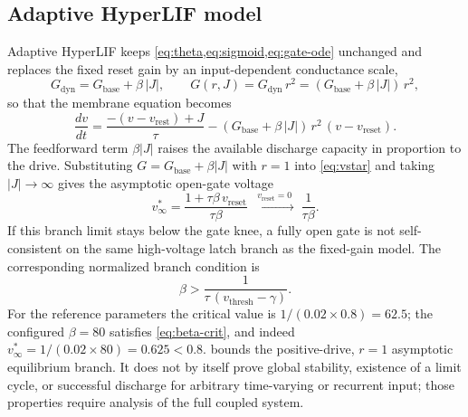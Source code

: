 \documentclass[11pt]{article}
\newcommand{\vth}{v_{\mathrm{thresh}}}
\newcommand{\vr}{v_{\mathrm{rest}}}
\newcommand{\vre}{v_{\mathrm{reset}}}
\newcommand{\Gbase}{G_{\mathrm{base}}}
\newcommand{\Gdyn}{G_{\mathrm{dyn}}}
\begin{document}
\subsection{Adaptive HyperLIF model}\label{sec:adaptive}
Adaptive HyperLIF keeps \cref{eq:theta,eq:sigmoid,eq:gate-ode} unchanged and
replaces the fixed reset gain by an input-dependent conductance scale,
\begin{equation}
  \Gdyn = \Gbase + \beta\,|J|, \qquad
  G(r,J) = \Gdyn\, r^2 = (\Gbase + \beta\,|J|)\, r^2,
  \label{eq:adaptive-gain}
\end{equation}
so that the membrane equation becomes
\begin{equation}
  \frac{dv}{dt} = \frac{-(v-\vr)+J}{\tau} - (\Gbase + \beta\,|J|)\,r^2\,(v-\vre).
  \label{eq:adaptive-ode}
\end{equation}
The feedforward term $\beta|J|$ raises the available discharge capacity in
proportion to the drive. Substituting $G=\Gbase+\beta|J|$ with $r=1$ into
\cref{eq:vstar} and taking $|J|\to\infty$ gives the asymptotic open-gate voltage
\begin{equation}
  v^\ast_\infty = \frac{1+\tau\beta\,\vre}{\tau\beta}
  \;\xrightarrow{\;\vre=0\;}\; \frac{1}{\tau\beta}. \label{eq:vinf}
\end{equation}
If this branch limit stays below the gate knee, a fully open gate is not
self-consistent on the same high-voltage latch branch as the fixed-gain model.
The corresponding normalized branch condition is
\begin{equation}
  \boxed{\;\beta > \frac{1}{\tau\,(\vth-\gamma)}.\;} \label{eq:beta-crit}
\end{equation}
For the reference parameters the critical value is
$1/(0.02\times 0.8)=62.5$; the configured $\beta=80$ satisfies
\cref{eq:beta-crit}, and indeed $v^\ast_\infty=1/(0.02\times 80)=0.625<0.8$.
 bounds the positive-drive, $r=1$ asymptotic equilibrium
branch. It does not by itself prove global stability, existence of a limit
cycle, or successful discharge for arbitrary time-varying or recurrent input;
those properties require analysis of the full coupled system.

\end{document}
